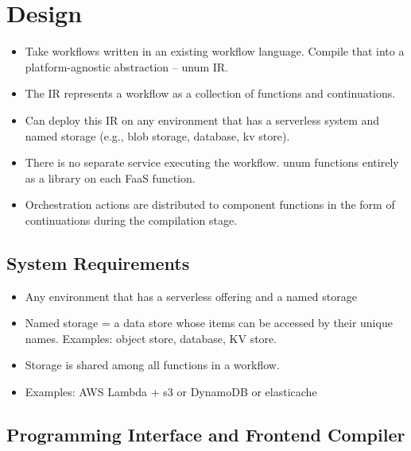 \section{Design}\label{sec:design}

\begin{itemize}
	\item Take workflows written in an existing workflow language. Compile
	that into a platform-agnostic abstraction -- unum IR.

	\item The IR represents a workflow as a collection of functions and
	continuations.

	\item Can deploy this IR on any environment that has a serverless system
	and named storage (e.g., blob storage, database, kv store).

	\item There is no separate service executing the workflow. unum functions
	entirely as a library on each FaaS function.

	\item Orchestration actions are distributed to component functions in the
	form of continuations during the compilation stage.

\end{itemize}



\subsection{System Requirements}

\begin{itemize}
	\item Any environment that has a serverless offering and a named storage
	\item Named storage = a data store whose items can be accessed by their
	unique names. Examples: object store, database, KV store.
	\item Storage is shared among all functions in a workflow.
	\item Examples: AWS Lambda + s3 or DynamoDB or elasticache
\end{itemize} 



\subsection{Programming Interface and Frontend Compiler}

